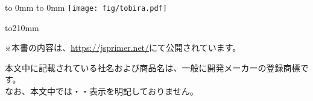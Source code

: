 \begin{comment}
%
%
\end{comment}
\thispagestyle{empty}
\vbox to 0mm{\vspace*{-24truemm}
\hbox to 0mm{
\hspace*{-26truemm}\texttt{[image: fig/tobira.pdf]}
}\vss}
\pagebreak


\begin{comment}
%
%
\end{comment}

\thispagestyle{frontheadings}

\vbox to210mm{ \vfil
\vbox{
※本書の内容は、\url{https://jsprimer.net/}にて公開されています。\vspace{4mm}
}
\begin{minipage}[b]{112mm}
%
% 
\begin{spacing}{1.0}
\begin{small}
本文中に記載されている社名および商品名は、一般に開発メーカーの登録商標です。\\
なお、本文中では\texttrademark ・\textcopyright ・\textregistered 表示を明記しておりません。
\end{small}
\end{spacing}
\end{minipage}
}
